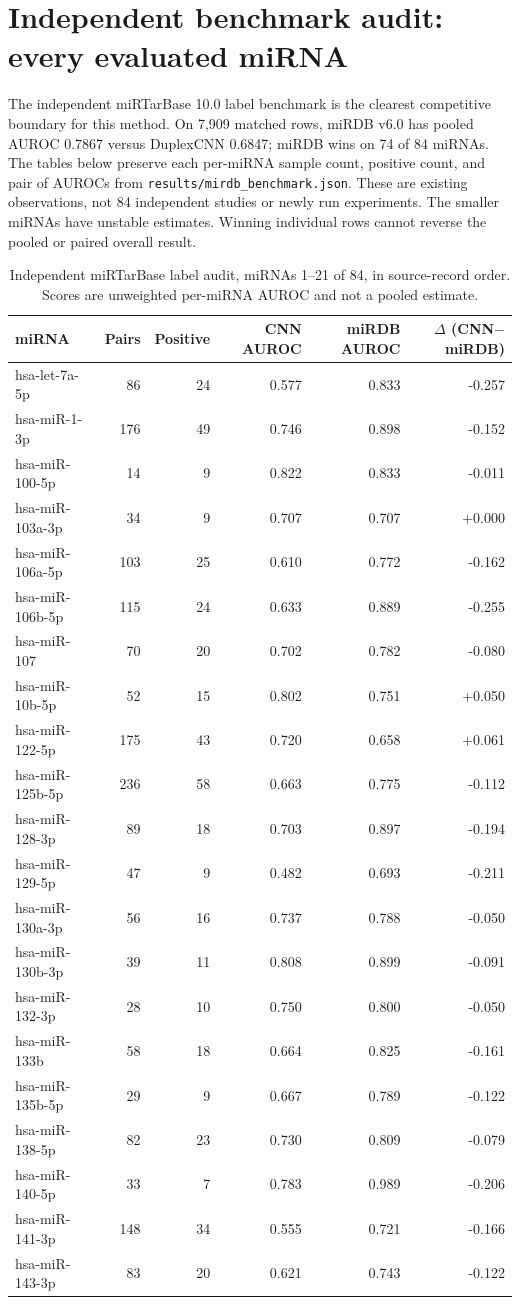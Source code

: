 \section{Independent benchmark audit: every evaluated miRNA}
The independent miRTarBase 10.0 label benchmark is the clearest competitive boundary for this method. On 7,909 matched rows, miRDB v6.0 has pooled AUROC 0.7867 versus DuplexCNN 0.6847; miRDB wins on 74 of 84 miRNAs. The tables below preserve each per-miRNA sample count, positive count, and pair of AUROCs from \texttt{results/mirdb\_benchmark.json}. These are existing observations, not 84 independent studies or newly run experiments. The smaller miRNAs have unstable estimates. Winning individual rows cannot reverse the pooled or paired overall result.
\smallskip
\begin{table}[htbp]\centering\scriptsize
\begin{tabular}{lrrrrr}\hline
miRNA & Pairs & Positive & CNN AUROC & miRDB AUROC & $\Delta$ (CNN$-$miRDB) \\ \hline
hsa-let-7a-5p & 86 & 24 & 0.577 & 0.833 & -0.257 \\
hsa-miR-1-3p & 176 & 49 & 0.746 & 0.898 & -0.152 \\
hsa-miR-100-5p & 14 & 9 & 0.822 & 0.833 & -0.011 \\
hsa-miR-103a-3p & 34 & 9 & 0.707 & 0.707 & +0.000 \\
hsa-miR-106a-5p & 103 & 25 & 0.610 & 0.772 & -0.162 \\
hsa-miR-106b-5p & 115 & 24 & 0.633 & 0.889 & -0.255 \\
hsa-miR-107 & 70 & 20 & 0.702 & 0.782 & -0.080 \\
hsa-miR-10b-5p & 52 & 15 & 0.802 & 0.751 & +0.050 \\
hsa-miR-122-5p & 175 & 43 & 0.720 & 0.658 & +0.061 \\
hsa-miR-125b-5p & 236 & 58 & 0.663 & 0.775 & -0.112 \\
hsa-miR-128-3p & 89 & 18 & 0.703 & 0.897 & -0.194 \\
hsa-miR-129-5p & 47 & 9 & 0.482 & 0.693 & -0.211 \\
hsa-miR-130a-3p & 56 & 16 & 0.737 & 0.788 & -0.050 \\
hsa-miR-130b-3p & 39 & 11 & 0.808 & 0.899 & -0.091 \\
hsa-miR-132-3p & 28 & 10 & 0.750 & 0.800 & -0.050 \\
hsa-miR-133b & 58 & 18 & 0.664 & 0.825 & -0.161 \\
hsa-miR-135b-5p & 29 & 9 & 0.667 & 0.789 & -0.122 \\
hsa-miR-138-5p & 82 & 23 & 0.730 & 0.809 & -0.079 \\
hsa-miR-140-5p & 33 & 7 & 0.783 & 0.989 & -0.206 \\
hsa-miR-141-3p & 148 & 34 & 0.555 & 0.721 & -0.166 \\
hsa-miR-143-3p & 83 & 20 & 0.621 & 0.743 & -0.122 \\
\hline\end{tabular}
\caption{Independent miRTarBase label audit, miRNAs 1--21 of 84, in source-record order. Scores are unweighted per-miRNA AUROC and not a pooled estimate.}\label{tab:mirna-audit-1}
\end{table}
